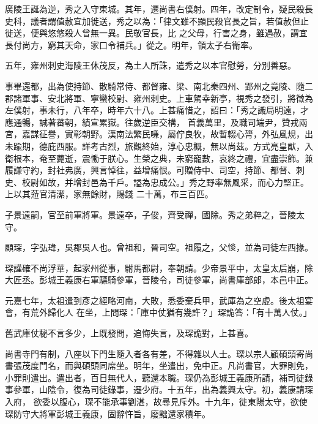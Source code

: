 \begin{pinyinscope}
 廣陵王誕為逆，秀之入守東城。其年，遷尚書右僕射。四年，改定制令，疑民殺長史科，議者謂值赦宜加徙送，秀之以為：「律文雖不顯民殺官長之旨，若值赦但止徙送，便與悠悠殺人曾無一異。民敬官長，比
 之父母，行害之身，雖遇赦，謂宜長付尚方，窮其天命，家口令補兵。」從之。明年，領太子右衛率。



 五年，雍州刺史海陵王休茂反，為土人所誅，遣秀之以本官慰勞，分別善惡。



 事畢還都，出為使持節、散騎常侍、都督雍、梁、南北秦四州、郢州之竟陵、隨二郡諸軍事、安北將軍、寧蠻校尉、雍州刺史。上車駕幸新亭，視秀之發引，將徵為左僕射，事未行，八年卒，時年六十八。上甚痛惜之，詔曰：「秀之識局明遠，才應通暢，誠著蕃朝，績宣累嶽。往歲逆臣交構，
 首義萬里，及職司端尹，贊戎兩宮，嘉謀征譽，實彰朝野。漢南法繁民嗛，屬佇良牧，故暫輟心膂，外弘風規，出未踰期，德庇西服。詳考古烈，旅觀終始，淳心忠概，無以尚茲。方式亮皇猷，入衛根本，奄至薨逝，震慟于朕心。生榮之典，未窮寵數，哀終之禮，宜盡崇飾。兼履謙守約，封社弗廣，興言悼往，益增痛恨。可贈侍中、司空，持節、都督、刺史、校尉如故，并增封邑為千戶。謚為忠成公。」秀之野率無風采，而心力堅正。上以其蒞官清潔，家無餘財，賜錢
 二十萬，布三百匹。



 子景遠嗣，官至前軍將軍。景遠卒，子俊，齊受禪，國除。秀之弟粹之，晉陵太守。



 顧琛，字弘瑋，吳郡吳人也。曾祖和，晉司空。祖履之，父惔，並為司徒左西掾。



 琛謹確不尚浮華，起家州從事，駙馬都尉，奉朝請。少帝景平中，太皇太后崩，除大匠丞。彭城王義康右軍驃騎參軍，晉陵令，司徒參軍，尚書庫部郎，本邑中正。



 元嘉七年，太祖遣到彥之經略河南，大敗，悉委棄兵甲，武庫為之空虛。後太祖宴會，有荒外歸化人
 在坐，上問琛：「庫中仗猶有幾許？」琛詭答：「有十萬人仗。」



 舊武庫仗秘不言多少，上既發問，追悔失言，及琛詭對，上甚喜。



 尚書寺門有制，八座以下門生隨入者各有差，不得雜以人士。琛以宗人顧碩頭寄尚書張茂度門名，而與碩頭同席坐。明年，坐遣出，免中正。凡尚書官，大罪則免，小罪則遣出。遣出者，百日無代人，聽還本職。琛仍為彭城王義康所請，補司徒錄事參軍，山陰令，復為司徒錄事，遷少府。十五年，出為義興太守。初，義康請琛入府，
 欲委以腹心，琛不能承事劉湛，故尋見斥外。十九年，徙東陽太守，欲使琛防守大將軍彭城王義康，固辭忤旨，廢黜還家積年。




\end{pinyinscope}
